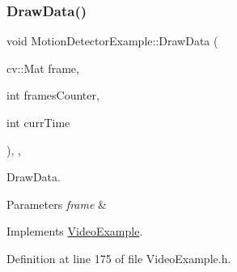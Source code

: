 \subsubsection{\texorpdfstring{Draw\+Data()}{DrawData()}}
{\footnotesize\ttfamily void Motion\+Detector\+Example\+::\+Draw\+Data (\begin{DoxyParamCaption}\item[{cv\+::\+Mat}]{frame,  }\item[{int}]{frames\+Counter,  }\item[{int}]{curr\+Time }\end{DoxyParamCaption})\hspace{0.3cm}{\ttfamily [inline]}, {\ttfamily [protected]}, {\ttfamily [virtual]}}



Draw\+Data. 


\begin{DoxyParams}{Parameters}
{\em frame} & \\
\hline
\end{DoxyParams}


Implements \mbox{\hyperlink{class_video_example_a53eb15977cb147dac218d8ea337986cd}{Video\+Example}}.



Definition at line 175 of file Video\+Example.\+h.


